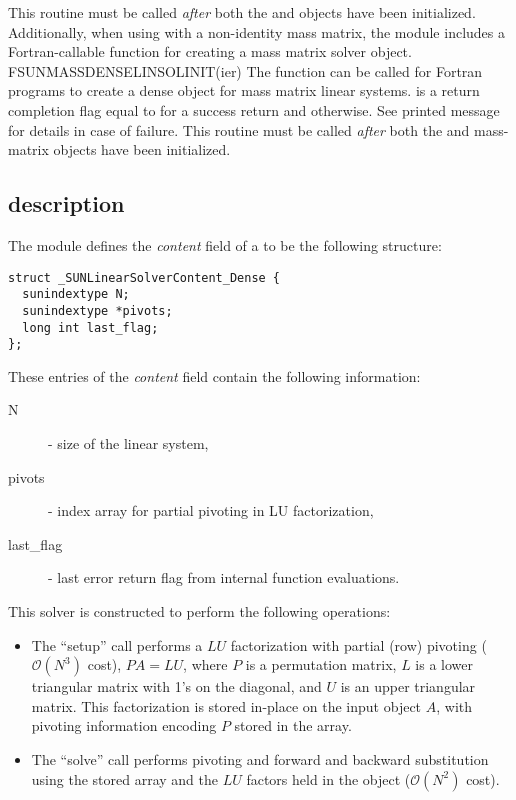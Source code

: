 {
  This routine must be
  called \emph{after} both the {\nvector} and {\sunmatrix} objects have
  been initialized.
}
Additionally, when using {\arkode} with a non-identity
mass matrix, the {\sunlinsoldense} module includes a Fortran-callable
function for creating a  mass matrix solver
object.
{
  FSUNMASSDENSELINSOLINIT(ier)
}
{
  The function  can be called for Fortran programs
  to create a dense  object for mass matrix linear
  systems.
}
{
}
{
   is a  return completion flag equal to  for a success
  return and  otherwise. See printed message for details in case
  of failure.
}
{
  This routine must be
  called \emph{after} both the {\nvector} and {\sunmatrix} mass-matrix
  objects have been initialized.
}

\subsection{{\sunlinsoldense} description}\label{ss:sunlinsol_dense_description}



The {\sunlinsoldense} module defines the {\em
content} field of a  to be the following structure:
\begin{verbatim} 
struct _SUNLinearSolverContent_Dense {
  sunindextype N;
  sunindextype *pivots;
  long int last_flag;
};
\end{verbatim}
These entries of the \emph{content} field contain the following
information:
\begin{description}
  \item[N] - size of the linear system,
  \item[pivots] - index array for partial pivoting in LU factorization,
  \item[last\_flag] - last error return flag from internal function evaluations.
\end{description}

This solver is constructed to perform the following operations:
\begin{itemize}
\item The ``setup'' call performs a $LU$ factorization with
  partial (row) pivoting ($\mathcal O(N^3)$ cost), $PA=LU$, where $P$
  is a permutation matrix, $L$ is a lower triangular matrix with 1's
  on the diagonal, and $U$ is an upper triangular matrix.  This
  factorization is stored in-place on the input {\sunmatdense} object
  $A$, with pivoting information encoding $P$ stored in
  the  array.
\item The ``solve'' call performs pivoting and forward and
  backward substitution using the stored  array and the
  $LU$ factors held in the {\sunmatdense} object ($\mathcal O(N^2)$
  cost).
\end{itemize}

